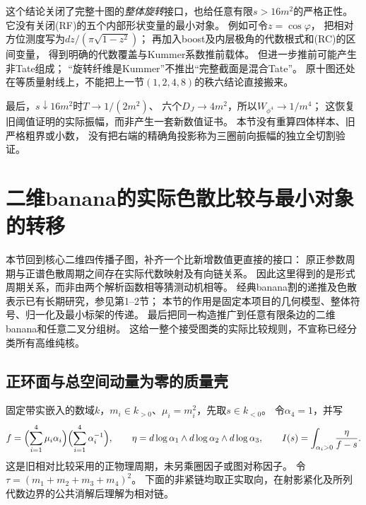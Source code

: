 \documentclass[11pt,a4paper]{ctexart}
\theoremstyle{cnplain}\newtheorem{theorem}{定理}[section]
\theoremstyle{definition}\newtheorem{definition}[theorem]{定义}
\theoremstyle{remark}\newtheorem{remark}[theorem]{注}
\begin{document}
这个结论关闭了完整十图的\emph{整体旋转}接口，也给任意有限$s>16m^2$的严格正性。
它没有关闭(RF)的五个内部形状变量的最小对象。
例如可令$z=\cos\varphi$，
把相对方位测度写为$dz/(\pi\sqrt{1-z^2})$；
再加入boost及内层极角的代数根式和(RC)的区间变量，
得到明确的代数覆盖与Kummer系数推前载体。
但进一步推前可能产生非Tate组成；
“旋转纤维是Kummer”不推出“完整截面是混合Tate”。
原十图还处在等质量射线上，不能把上一节$(1,2,4,8)$的秩六结论直接搬来。

最后，$s\downarrow16m^2$时$T\to1/(2m^2)$、
六个$D_J\to4m^2$，所以$W_{\phi^4}\to1/m^4$；
这恢复旧阈值证明的实际振幅，而非产生一套新数值证书。
本节没有重算四体样本、旧严格粗界或小数，
没有把右端的精确角投影称为三圈前向振幅的独立全切割验证。



\section{二维banana的实际色散比较与最小对象的转移}\label{sec:actualbananadispersion}
本节回到核心二维四传播子图，补齐一个比新增数值更直接的接口：
原正参数周期与正谱色散周期之间存在实际代数映射及有向链关系。
因此这里得到的是形式周期关系，而非由两个解析函数相等猜测动机相等。
经典banana割的递推及色散表示已有长期研究，参见\cite{KreimerBanana}第1--2节；
本节的作用是固定本项目的几何模型、整体符号、归一化及最小标架的传递。
最后把同一构造推广到任意有限条边的二维banana和任意二叉分组树。
这给一整个接受图类的实际比较规则，不宣称已经分类所有高维纯核。

\subsection{正环面与总空间动量为零的质量壳}
固定带实嵌入的数域$k$，$m_i\in k_{>0}$、$\mu_i=m_i^2$，先取$s\in k_{<0}$。
令$\alpha_4=1$，并写
\begin{equation}\label{eq:actualtorusperiod}
 f=\Bigl(\sum_{i=1}^4\mu_i\alpha_i\Bigr)
       \Bigl(\sum_{i=1}^4\alpha_i^{-1}\Bigr),\qquad
 \eta=d\log\alpha_1\wedge d\log\alpha_2\wedge d\log\alpha_3,
 \qquad I(s)=\int_{\alpha_i>0}\frac{\eta}{f-s}.
\end{equation}
这是旧相对比较采用的正物理周期，未另乘圈因子或图对称因子。
令$\tau=(m_1+m_2+m_3+m_4)^2$。
下面的非紧链均取正实取向，在射影紧化及所列代数边界的公共消解后理解为相对链。
\end{document}
